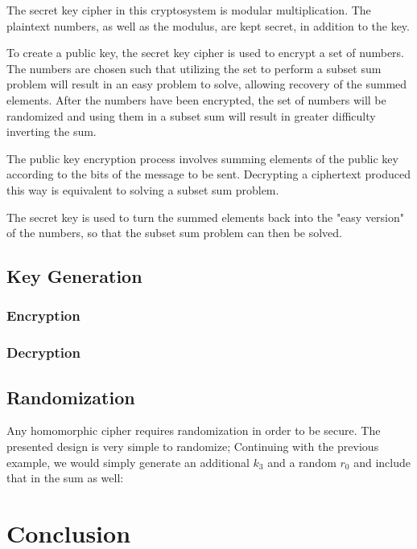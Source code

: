 \documentclass[preprint]{iacrtrans}
\begin{document}
The secret key cipher in this cryptosystem is modular multiplication. The plaintext numbers, as well as the modulus, are kept secret, in addition to the key.

To create a public key, the secret key cipher is used to encrypt a set of numbers. The numbers are chosen such that utilizing the set to perform a subset sum problem will result in an easy problem to solve, allowing recovery of the summed elements. After the numbers have been encrypted, the set of numbers will be randomized and using them in a subset sum will result in greater difficulty inverting the sum.

The public key encryption process involves summing elements of the public key according to the bits of the message to be sent. Decrypting a ciphertext produced this way is equivalent to solving a subset sum problem.

The secret key is used to turn the summed elements back into the "easy version" of the numbers, so that the subset sum problem can then be solved.

\subsection{Key Generation}
\subsubsection{Encryption}
\subsubsection{Decryption}

\subsection{Randomization}
Any homomorphic cipher requires randomization in order to be secure. The presented design is very simple to randomize; Continuing with the previous example, we would simply generate an additional $k_3$ and a random $r_0$ and include that in the sum as well:

\section{Conclusion}
\end{document}
